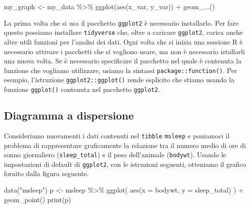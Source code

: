 \documentclass[
  10pt,
  italian,
  a4paper,
  extrafontsizes,onecolumn,openright
  ]{memoir}
\newenvironment{Shaded}{\begin{snugshade}}{\end{snugshade}}
\newcommand{\AttributeTok}[1]{\textcolor[rgb]{0.77,0.63,0.00}{#1}}
\newcommand{\FunctionTok}[1]{\textcolor[rgb]{0.00,0.00,0.00}{#1}}
\newcommand{\NormalTok}[1]{#1}
\newcommand{\OtherTok}[1]{\textcolor[rgb]{0.56,0.35,0.01}{#1}}
\newcommand{\SpecialCharTok}[1]{\textcolor[rgb]{0.00,0.00,0.00}{#1}}
\newcommand{\StringTok}[1]{\textcolor[rgb]{0.31,0.60,0.02}{#1}}
\begin{document}
\begin{Shaded}
\begin{Highlighting}[]
\NormalTok{my\_graph }\OtherTok{\textless{}{-}}\NormalTok{ my\_data }\SpecialCharTok{\%\textgreater{}\%} 
  \FunctionTok{ggplot}\NormalTok{(}\FunctionTok{aes}\NormalTok{(x\_var, y\_var)) }\SpecialCharTok{+}
  \FunctionTok{geom\_...}\NormalTok{()}
\end{Highlighting}
\end{Shaded}

La prima volta che si usa il pacchetto \texttt{ggplot2} è necessario installarlo. Per fare questo possiamo installare \texttt{tidyverse} che, oltre a caricare \texttt{ggplot2}, carica anche altre utili funzioni per l'analisi dei dati. Ogni volta che si inizia una sessione R è necessario attivare i pacchetti che si vogliono usare, ma non è necessario istallarli una nuova volta. Se è necessario specificare il pacchetto nel quale è contenuta la funzione che vogliamo utilizzare, usiamo la sintassi \texttt{package::function()}. Per esempio, l'istruzione \texttt{ggplot2::ggplot()} rende esplicito che stiamo usando la funzione \texttt{ggplot()} contenuta nel pacchetto \texttt{ggplot2}.

\hypertarget{diagramma-a-dispersione}{%
\subsection{Diagramma a dispersione}\label{diagramma-a-dispersione}}

Consideriamo nuovamenti i dati contenuti nel \texttt{tibble} \texttt{msleep} e poniamoci il problema di rappresentare graficamente la relazione tra il numero medio di ore di sonno giornaliero (\texttt{sleep\_total}) e il peso dell'animale (\texttt{bodywt}). Usando le impostazioni di default di \texttt{ggplot2}, con le istruzioni seguenti, otteniamo il grafico fornito dalla figura seguente.

\begin{Shaded}
\begin{Highlighting}[]
\FunctionTok{data}\NormalTok{(}\StringTok{"msleep"}\NormalTok{)}
\NormalTok{p }\OtherTok{\textless{}{-}}\NormalTok{ msleep }\SpecialCharTok{\%\textgreater{}\%} 
  \FunctionTok{ggplot}\NormalTok{(}
    \FunctionTok{aes}\NormalTok{(}\AttributeTok{x =}\NormalTok{ bodywt, }\AttributeTok{y =}\NormalTok{ sleep\_total)}
\NormalTok{  ) }\SpecialCharTok{+}
  \FunctionTok{geom\_point}\NormalTok{()}
\FunctionTok{print}\NormalTok{(p)}
\end{Highlighting}
\end{Shaded}
\end{document}
